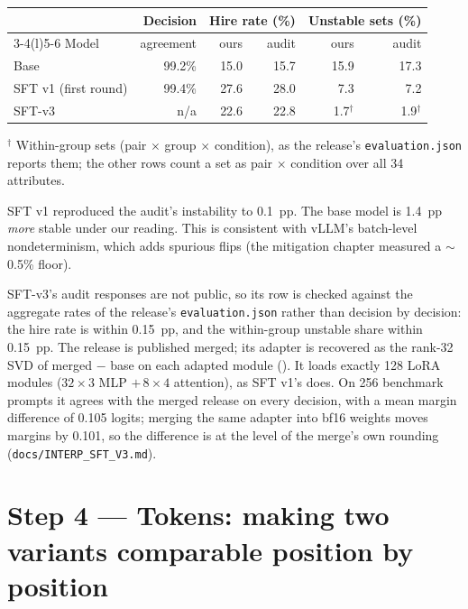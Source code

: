 \documentclass[11pt,a4paper]{article}
\begin{document}
\begin{center}
\small
\begin{tabular}{@{}lrrrrr@{}}
\toprule
 & Decision & \multicolumn{2}{c}{Hire rate (\%)} & \multicolumn{2}{c}{Unstable sets (\%)} \\
\cmidrule(lr){3-4}\cmidrule(l){5-6}
Model & agreement & ours & audit & ours & audit \\
\midrule
Base & 99.2\% & 15.0 & 15.7 & 15.9 & 17.3 \\
SFT v1 (first round) & 99.4\% & 27.6 & 28.0 & 7.3 & 7.2 \\
SFT-v3 & n/a & 22.6 & 22.8 & 1.7$^\dagger$ & 1.9$^\dagger$ \\
\bottomrule
\end{tabular}

\smallskip
{\footnotesize $^\dagger$ Within-group sets (pair $\times$ group $\times$ condition), as the
release's \texttt{evaluation.json} reports them; the other rows count a set as pair $\times$
condition over all 34 attributes.}
\end{center}

SFT v1 reproduced the audit's instability to 0.1~pp. The base model is 1.4~pp \emph{more} stable
under our reading. This is consistent with vLLM's batch-level nondeterminism, which adds spurious
flips (the mitigation chapter measured a $\sim$0.5\% floor).

SFT-v3's audit responses are not public, so its row is checked against the aggregate rates of the
release's \texttt{evaluation.json} rather than decision by decision: the hire rate is within
0.15~pp, and the within-group unstable share within 0.15~pp. The release is published merged;
its adapter is recovered as the rank-32 SVD of merged $-$ base on each adapted module
(). It loads exactly 128 LoRA modules
($32\times3$ MLP $+\,8\times4$ attention), as SFT v1's does. On 256 benchmark prompts it agrees
with the merged release on every decision, with a mean margin difference of 0.105 logits; merging
the same adapter into bf16 weights moves margins by 0.101, so the difference is at the level of
the merge's own rounding (\texttt{docs/INTERP\_SFT\_V3.md}).

\section{Step 4 --- Tokens: making two variants comparable position by position}
\end{document}
